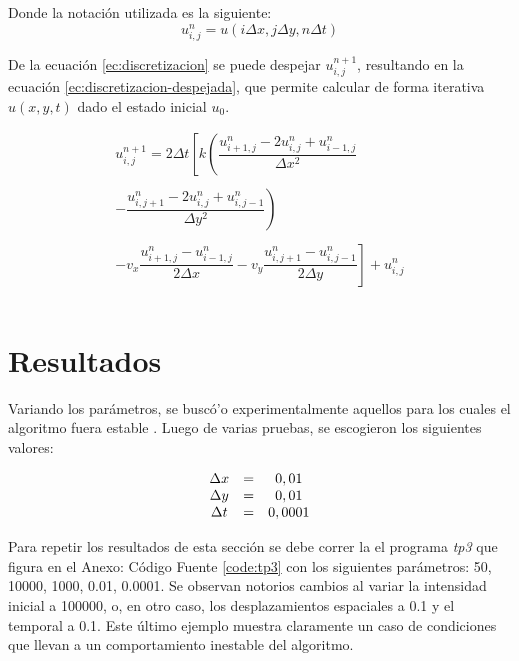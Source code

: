 \documentclass[twocolumn,a4paper,10pt]{article}
\begin{document}
Donde la notaci\'on utilizada es la siguiente:
\[
u_{i, j}^{n} = u(i\Delta x, j\Delta y, n\Delta t)
\]

De la ecuaci\'on \ref{ec:discretizacion} se puede despejar $u_{i,j}^{n+1}$, resultando en la ecuaci\'on \ref{ec:discretizacion-despejada}, que permite calcular 
de forma iterativa $u(x,y,t)$ dado el estado inicial $u_{0}$.

\begin{equation}
\label{ec:discretizacion-despejada}
\begin{array}{c}
u_{i,j}^{n+1} = 2\Delta t \left[ k \left( \dfrac{u_{i+1,j}^{n} - 2u_{i,j}^{n} + u_{i-1,j}^{n}}{\Delta x^2} \right.\right.\\
    \\
    \left. - \dfrac{u_{i,j+1}^{n} - 2u_{i,j}^{n} + u_{i,j-1}^{n}}{\Delta y^2}  \right) \\
     \\
 \left. - v_{x}\dfrac{u_{i+1,j}^{n} - u_{i-1,j}^{n}}{2\Delta x} -  v_{y}\dfrac{u_{i,j+1}^{n} - u_{i,j-1}^{n}}{2\Delta y} \right] + u_{i,j}^{n} \\
    \\
\end{array}       
\end{equation}

\section{Resultados}
\label{sec:resultados}

Variando los par\'ametros, se busc\'o'o experimentalmente aquellos para los cuales el algoritmo fuera estable \cite{Numerical-stability}. Luego de varias pruebas, 
se escogieron los siguientes valores:

\begin{equation}
    \nonumber
    \begin{array}{c c c}
        \Delta x & = & 0,01 \\
        \Delta y & = & 0,01 \\
        \Delta t & = & 0,0001 \\
    \end{array}
\end{equation}

Para repetir los resultados de esta secci\'on se debe correr la el programa \textit{tp3} que figura en el Anexo: C\'odigo Fuente \ref{code:tp3} con los 
siguientes par\'ametros: 50, 10000, 1000, 0.01, 0.0001. Se observan notorios cambios al variar la intensidad inicial a 100000, o, en otro caso,
 los desplazamientos espaciales a 0.1 y el temporal a 0.1. Este último ejemplo muestra claramente un caso de condiciones que llevan a un comportamiento
 inestable del algoritmo.
\end{document}
